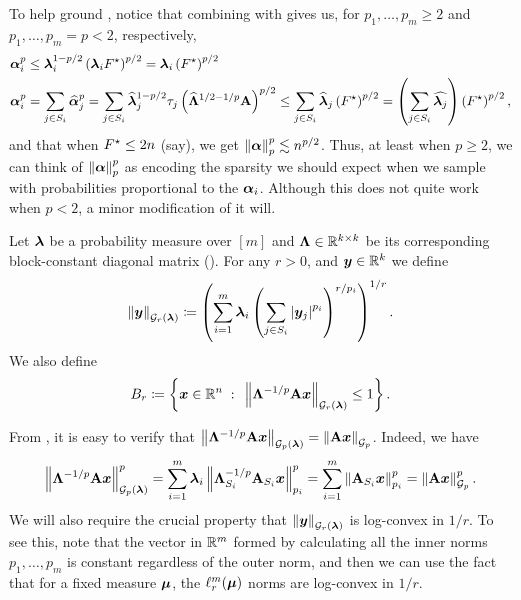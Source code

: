 \documentclass[11pt]{article}
\numberwithin{equation}{section}
\begin{document}
To help ground , notice that combining  with  gives us, for $p_1,\dots,p_m\ge 2$ and $p_1,\dots,p_m=p < 2$, respectively,
\begin{equation}
\begin{aligned}
    \bm{\alpha}_i^p &\le \bm{\lambda}_i^{1-p/2}\left(\bm{\lambda}_iF^{\star}\right)^{p/2} = \bm{\lambda}_i\left(F^{\star}\right)^{p/2} \\
    \bm{\alpha}_i^p &= \sum_{j \in S_i} \widehat{\bm{\alpha}}_j^p = \sum_{j \in S_i} \widehat{\bm{\lambda}}_j^{1-p/2}\tau_j\left(\widehat{\mathbf{\Lambda}}^{1/2-1/p}\mathbf{A}\right)^{p/2} \le \sum_{j \in S_i}\widehat{\bm{\lambda}}_j\left(F^{\star}\right)^{p/2} = \left(\sum_{j\in S_i} \widehat{\bm{\lambda}_j}\right)\left(F^{\star}\right)^{p/2},
\end{aligned}
\label{eq:alpha_to_fstar}
\end{equation}
and that when $F^{\star} \le 2n$ (say), we get $\left\lVert \bm{\alpha} \right\rVert_p^p \lesssim n^{p/2}$. Thus, at least when $p\ge 2$, we can think of $\left\lVert \bm{\alpha} \right\rVert_p^p$ as encoding the sparsity we should expect when we sample with probabilities proportional to the $\bm{\alpha}_i$. Although this does not quite work when $p < 2$, a minor modification of it will.

\begin{definition}
\label{defn:unit_ball}
Let $\bm{\lambda}$ be a probability measure over $[m]$ and $\mathbf{\Lambda}\in\mathbb{R}^{k\times k}$ be its corresponding block-constant diagonal matrix (). For any $r > 0$, and $\bm{y}\in\mathbb{R}^k$ we define
\begin{align*}
    \left\lVert \bm{y} \right\rVert_{\mathcal{G}_{r}(\bm{\lambda})} \coloneqq \left(\sum_{i=1}^m \bm{\lambda}_i\left(\sum_{j \in S_i} \left\lvert \bm{y}_j \right\rvert^{p_i}\right)^{r/p_i}\right)^{1/r}.
\end{align*}
We also define
\begin{align*}
    B_r \coloneqq\left\{\bm{x} \in\mathbb{R}^n {\;\; : \;\;} \left\lVert \mathbf{\Lambda}^{-1/p}\mathbf{A}\bm{x} \right\rVert_{\mathcal{G}_{r}(\bm{\lambda})} \le 1\right\}.
\end{align*}
\end{definition}

From , it is easy to verify that $\left\lVert \mathbf{\Lambda}^{-1/p}\mathbf{A}\bm{x} \right\rVert_{\mathcal{G}_{p}(\bm{\lambda})} = \left\lVert \mathbf{A}\bm{x} \right\rVert_{\mathcal{G}_{p}}$. Indeed, we have
\begin{align*}
    \left\lVert \mathbf{\Lambda}^{-1/p}\mathbf{A}\bm{x} \right\rVert_{\mathcal{G}_{p}(\bm{\lambda})}^p = \sum_{i=1}^m \bm{\lambda}_i\left\lVert \mathbf{\Lambda}_{S_i}^{-1/p}\mathbf{A}_{S_i}\bm{x} \right\rVert_{p_i}^{p} = \sum_{i=1}^m \left\lVert \mathbf{A}_{S_i}\bm{x} \right\rVert_{p_i}^p = \left\lVert \mathbf{A}\bm{x} \right\rVert_{\mathcal{G}_{p}}^p.
\end{align*}
We will also require the crucial property that $\left\lVert \bm{y} \right\rVert_{\mathcal{G}_{r}(\bm{\lambda})}$ is log-convex in $1/r$. To see this, note that the vector in $\mathbb{R}^m$ formed by calculating all the inner norms $p_1,\dots,p_m$ is constant regardless of the outer norm, and then we can use the fact that for a fixed measure $\bm{\mu}$, the $\ell_r^m(\bm{\mu})$ norms are log-convex in $1/r$.
\end{document}
